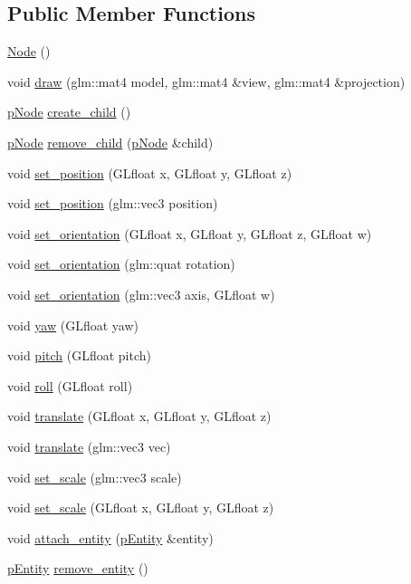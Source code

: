 \subsection*{Public Member Functions}
\begin{DoxyCompactItemize}
\item 
\hyperlink{classNode_ad7a34779cad45d997bfd6d3d8043c75f}{Node} ()
\item 
void \hyperlink{classNode_a68d5f074d4d9487384500bdcc80d489b}{draw} (glm\+::mat4 model, glm\+::mat4 \&view, glm\+::mat4 \&projection)
\item 
\hyperlink{Node_8hpp_ac189bcbe7762c82a1a30c219d6ebdf75}{p\+Node} \hyperlink{classNode_ac9fb91f489ca00c8e91f10eda66cfffe}{create\+\_\+child} ()
\item 
\hyperlink{Node_8hpp_ac189bcbe7762c82a1a30c219d6ebdf75}{p\+Node} \hyperlink{classNode_abdaf4340bd75b5621c0a75f18590476e}{remove\+\_\+child} (\hyperlink{Node_8hpp_ac189bcbe7762c82a1a30c219d6ebdf75}{p\+Node} \&child)
\item 
void \hyperlink{classNode_ac2eb884b8982645f6d7438025a60cbff}{set\+\_\+position} (G\+Lfloat x, G\+Lfloat y, G\+Lfloat z)
\item 
void \hyperlink{classNode_a056137e4e51a4587490451c1dbefb23e}{set\+\_\+position} (glm\+::vec3 position)
\item 
void \hyperlink{classNode_a02c9938a7714e058c07b453552b6ad6d}{set\+\_\+orientation} (G\+Lfloat x, G\+Lfloat y, G\+Lfloat z, G\+Lfloat w)
\item 
void \hyperlink{classNode_a37476444f918a2e23f6229845dc44f6e}{set\+\_\+orientation} (glm\+::quat rotation)
\item 
void \hyperlink{classNode_a4fe91fd27202fb20d219ba476e6ff3a1}{set\+\_\+orientation} (glm\+::vec3 axis, G\+Lfloat w)
\item 
void \hyperlink{classNode_a6bdc035991cc9518b6139d34e32603a8}{yaw} (G\+Lfloat yaw)
\item 
void \hyperlink{classNode_aa88c3fa387ddc4c8991c20f6e901a247}{pitch} (G\+Lfloat pitch)
\item 
void \hyperlink{classNode_a078e56eb86c4049d9c282485b8439cf1}{roll} (G\+Lfloat roll)
\item 
void \hyperlink{classNode_a0c403c5effe407349dea4039eb2987be}{translate} (G\+Lfloat x, G\+Lfloat y, G\+Lfloat z)
\item 
void \hyperlink{classNode_abfa9ae84c73cd9197dd27aee75e595ce}{translate} (glm\+::vec3 vec)
\item 
void \hyperlink{classNode_a3faec015e7b7739ee810a44540aa2250}{set\+\_\+scale} (glm\+::vec3 scale)
\item 
void \hyperlink{classNode_ad136d4dc5400c4091ea22e6d24a445e5}{set\+\_\+scale} (G\+Lfloat x, G\+Lfloat y, G\+Lfloat z)
\item 
void \hyperlink{classNode_a778a680844ceddae2c5fd76755a5d99d}{attach\+\_\+entity} (\hyperlink{Entity_8hpp_ae424507ba09ae72f3c142ce741f3a1e7}{p\+Entity} \&entity)
\item 
\hyperlink{Entity_8hpp_ae424507ba09ae72f3c142ce741f3a1e7}{p\+Entity} \hyperlink{classNode_ad27c6c51391f092f6dc2fdea545f283d}{remove\+\_\+entity} ()
\end{DoxyCompactItemize}
